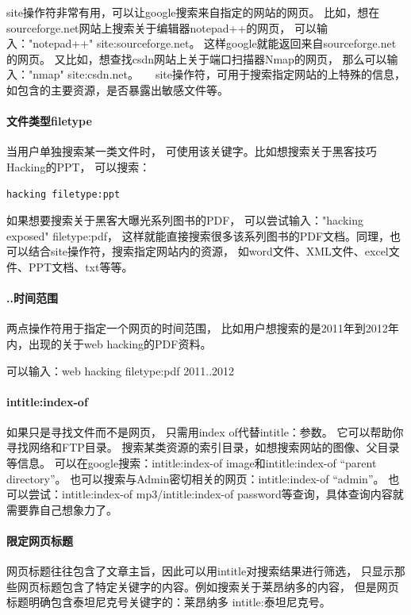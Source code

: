 \documentclass{book}
\begin{document}
site操作符非常有用，可以让google搜索来自指定的网站的网页。
比如，想在sourceforge.net网站上搜索关于编辑器notepad++的网页，
可以输入："notepad++"  site:sourceforge.net。
这样google就能返回来自sourceforge.net的网页。
又比如，想查找csdn网站上关于端口扫描器Nmap的网页，
那么可以输入："nmap"  site:csdn.net。　　site操作符，可用于搜索指定网站的上特殊的信息，
如包含的主要资源，是否暴露出敏感文件等。

\paragraph{文件类型filetype}当用户单独搜索某一类文件时，
可使用该关键字。比如想搜索关于黑客技巧Hacking的PPT，
可以搜索：

\begin{lstlisting}
hacking filetype:ppt
\end{lstlisting}

如果想要搜索关于黑客大曝光系列图书的PDF，
可以尝试输入："hacking exposed" filetype:pdf，
这样就能直接搜索很多该系列图书的PDF文档。同理，也可以结合site操作符，搜索指定网站内的资源，
如word文件、XML文件、excel文件、PPT文档、txt等等。

\paragraph{..时间范围}
两点操作符用于指定一个网页的时间范围，
比如用户想搜索的是2011年到2012年内，出现的关于web hacking的PDF资料。

可以输入：web hacking filetype:pdf 2011..2012

\paragraph{intitle:index-of}
如果只是寻找文件而不是网页，
只需用index of代替intitle：参数。
它可以帮助你寻找网络和FTP目录。
搜索某类资源的索引目录，如想搜索网站的图像、父目录等信息。
可以在google搜索：intitle:index-of image和intitle:index-of “parent directory”。
也可以搜索与Admin密切相关的网页：intitle:index-of “admin”。 
也可以尝试：intitle:index-of mp3/intitle:index-of password等查询，具体查询内容就需要靠自己想象力了。

\paragraph{限定网页标题}
网页标题往往包含了文章主旨，因此可以用intitle对搜索结果进行筛选，
只显示那些网页标题包含了特定关键字的内容。例如搜索关于莱昂纳多的内容，
但是网页标题明确包含泰坦尼克号关键字的：莱昂纳多 intitle:泰坦尼克号。
\end{document}
